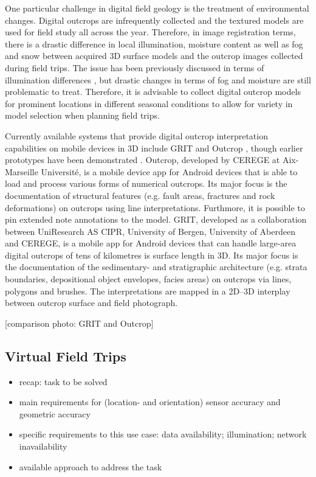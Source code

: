 \documentclass[review]{elsarticle}
\begin{document}
One particular challenge in digital field geology is the treatment of environmental changes. Digital outcrops are infrequently collected and the textured models are used for field study all across the year. Therefore, in image registration terms, there is a drastic difference in local illumination, moisture content as well as fog and snow between acquired 3D surface models and the outcrop images collected during field trips. The issue has been previously discussed in terms of illumination differences \cite{Kehl2017_PHOR}, but drastic changes in terms of fog and moisture are still problematic to treat. Therefore, it is advisable to collect digital outcrop models for prominent locations in different seasonal conditions to allow for variety in model selection when planning field trips.

Currently available systems that provide digital outcrop interpretation capabilities on mobile devices in 3D include \gls{GRIT} \cite{Kehl2016_VGCabstract} and Outcrop \cite{Viseur2014_VGCabstract}, though earlier prototypes have been demonstrated \cite{Hama2013}. Outcrop, developed by \gls{CEREGE} at Aix-Marseille Universit\'{e}, is a mobile device app for Android devices that is able to load and process various forms of numerical outcrops. Its major focus is the documentation of structural features (e.g. fault areas, fractures and rock deformations) on outcrops using line interpretations. Furthmore, it is possible to pin extended note annotations to the model. \gls{GRIT}, developed as a collaboration between UniResearch AS CIPR, University of Bergen, University of Aberdeen and \gls{CEREGE}, is a mobile app for Android devices that can handle large-area digital outcrops of tens of kilometres is surface length in 3D. Its major focus is the documentation of the sedimentary- and stratigraphic architecture (e.g. strata boundaries, depositional object envelopes, facies areas) on outcrops via lines, polygons and brushes. The interpretations are mapped in a 2D--3D interplay between outcrop surface and field photograph.

[comparison photo: GRIT and Outcrop]

\subsection{Virtual Field Trips}
\label{sec:applications:virtual_field_trip}

\begin{itemize}
\item recap: task to be solved
\item main requirements for (location- and orientation) sensor accuracy and geometric accuracy
\item specific requirements to this use case: data availability; illumination; network inavailability
\item available approach to address the task
\end{itemize}
\end{document}
